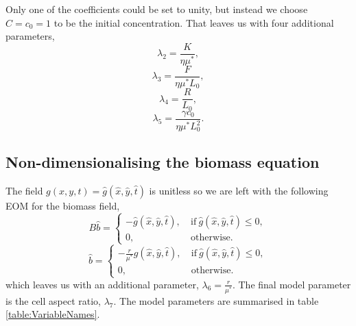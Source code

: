 Only one of the coefficients could be set to unity, but instead we choose $C = c_0 = 1$ to be the initial 
concentration. That leaves us with four additional parameters,
\begin{equation*}
    \lambda_2 = \frac{K}{ \eta \mu^*},
\end{equation*}
\begin{equation*}
    \lambda_3 = \frac{F}{  \eta \mu^* L_0},
\end{equation*}
\begin{equation*}
    \lambda_4 = \frac{R}{L_0},
\end{equation*}
\begin{equation*}
    \lambda_5 = \frac{\gamma c_0}{ \eta \mu^*L_0^2}.
\end{equation*}

\subsection{Non-dimensionalising the biomass equation}
The field $g(x,y,t) = \hat{g}(\hat{x},\hat{y},\hat{t})$ is unitless 
so we are left with the following EOM for the biomass field,
\begin{equation*}
    B\hat{b} = \begin{cases}
                -  \hat{g}(\hat{x},\hat{y},\hat{t}), & \ \textrm{if} \ \hat{g}(\hat{x},\hat{y},\hat{t}) \leq 0, \\
                    0, &    \ \textrm{otherwise}.
               \end{cases}
\end{equation*}
\begin{equation*}
    \hat{b} = \begin{cases}
                -  \frac{r}{\mu^*}\hat{g}(\hat{x},\hat{y},\hat{t}), & \ \textrm{if} \ \hat{g}(\hat{x},\hat{y},\hat{t}) \leq 0, \\
                    0, &    \ \textrm{otherwise}.
               \end{cases}
\end{equation*}
which leaves us with an additional parameter, $\lambda_6 =\frac{r}{\mu^*}$. The final model parameter is the cell aspect ratio, $\lambda_7$.
The model parameters are summarised in table \ref{table:VariableNames}.


